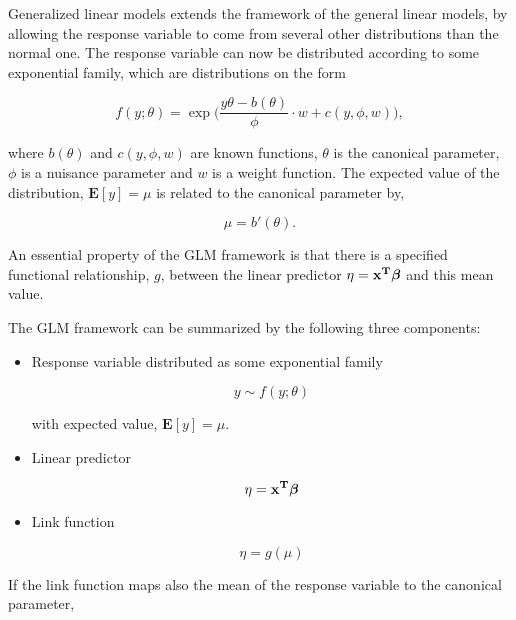 Generalized linear models extends the framework of the general linear models, by allowing the response variable to come from several other distributions than the normal one. The response variable can now be distributed according to some exponential family, which are distributions on the form

\begin{equation}
    f(y;\theta) = \exp\Big(\frac{y \theta - b(\theta)}{\phi} \cdot w + c(y,\phi,w)\Big),
\end{equation}

where $b(\theta)$ and $c(y,\phi,w)$ are known functions, $\theta$ is the canonical parameter, $\phi$ is a nuisance parameter and $w$ is a weight function. The expected value of the distribution, $\mathbf{E}[y] = \mu$ is related to the canonical parameter by,

\begin{equation}
    \mu = b'(\theta).
\end{equation}

An essential property of the GLM framework is that there is a specified functional relationship, $g$, between the linear predictor $\eta = \bf x^T \bm{ \beta}$ and this mean value.

The GLM framework can be summarized by the following three components:

\begin{itemize}

\item Response variable distributed as some exponential family

\begin{equation}
    y \sim f(y;\theta)
\end{equation}

with expected value, $\mathbf{E}[y] = \mu$.

\item Linear predictor

\begin{equation}
    \eta = \bf x^T \bm{ \beta}
\end{equation}

\item Link function

\begin{equation}
    \eta = g(\mu)
\end{equation}

\end{itemize}

If the link function maps also the mean of the response variable to the canonical parameter,

